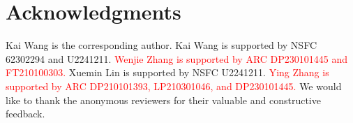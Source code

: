 \section{Acknowledgments}
\label{acknowledgment}
Kai Wang is the corresponding author.
Kai Wang is supported by NSFC 62302294 and U2241211. 
\textcolor{red}{Wenjie Zhang is supported by ARC DP230101445 and FT210100303.} 
Xuemin Lin is supported by NSFC U2241211. 
\textcolor{red}{Ying Zhang is supported by ARC DP210101393, LP210301046, and DP230101445.} 
We would like to thank the anonymous reviewers for their valuable and constructive feedback. 
